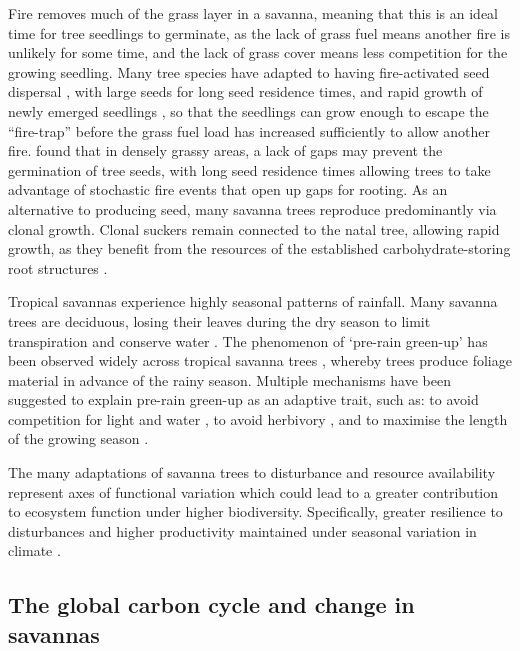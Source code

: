 \begin{refsection}
Fire removes much of the grass layer in a savanna, meaning that this is an ideal time for tree seedlings to germinate, as the lack of grass fuel means another fire is unlikely for some time, and the lack of grass cover means less competition for the growing seedling. Many tree species have adapted to having fire-activated seed dispersal \citep{Veldman2015}, with large seeds for long seed residence times, and rapid growth of newly emerged seedlings \citep{Daibes2019}, so that the seedlings can grow enough to escape the ``fire-trap'' before the grass fuel load has increased sufficiently to allow another fire. \citet{Wakeling2015} found that in densely grassy areas, a lack of gaps may prevent the germination of tree seeds, with long seed residence times allowing trees to take advantage of stochastic fire events that open up gaps for rooting. As an alternative to producing seed, many savanna trees reproduce predominantly via clonal growth. Clonal suckers remain connected to the natal tree, allowing rapid growth, as they benefit from the resources of the established carbohydrate-storing root structures \citep{Bond2003}.

Tropical savannas experience highly seasonal patterns of rainfall. Many savanna trees are deciduous, losing their leaves during the dry season to limit transpiration and conserve water \citep{Dahlin2016}. The phenomenon of `pre-rain green-up' has been observed widely across tropical savanna trees \citep{Archibald2007, Borchert1994, Williams1997}, whereby trees produce foliage material in advance of the rainy season. Multiple mechanisms have been suggested to explain pre-rain green-up as an adaptive trait, such as: to avoid competition for light and water \citep{Ryan2017}, to avoid herbivory \citep{Aide1988}, and to maximise the length of the growing season \citep{Scholes1993}. 

The many adaptations of savanna trees to disturbance and resource availability represent axes of functional variation which could lead to a greater contribution to ecosystem function under higher biodiversity. Specifically, greater resilience to disturbances and higher productivity maintained under seasonal variation in climate \citep{Diaz2001, Mori2012}.

\subsection{The global carbon cycle and change in savannas}


\end{refsection}
